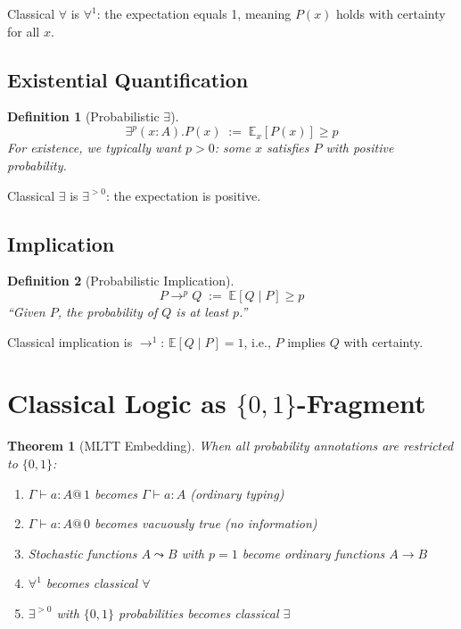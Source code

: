 \documentclass[11pt,a4paper]{article}
\makeatletter
\newtheorem{definition}{Definition}[section]
\newtheorem{theorem}{Theorem}[section]
\newcommand{\E}{\mathbb{E}}
\newcommand{\pmark}[1]{@\, #1}  %
\makeatother
\begin{document}
Classical $\forall$ is $\forall^1$: the expectation equals 1, meaning $P(x)$ holds with certainty for all $x$.

\subsection{Existential Quantification}

\begin{definition}[Probabilistic $\exists$]
\[
\exists^p (x : A). P(x) \;:=\; \E_x[P(x)] \geq p
\]
For existence, we typically want $p > 0$: some $x$ satisfies $P$ with positive probability.
\end{definition}

Classical $\exists$ is $\exists^{>0}$: the expectation is positive.

\subsection{Implication}

\begin{definition}[Probabilistic Implication]
\[
P \to^p Q \;:=\; \E[Q \mid P] \geq p
\]
``Given $P$, the probability of $Q$ is at least $p$.''
\end{definition}

Classical implication is $\to^1$: $\E[Q \mid P] = 1$, i.e., $P$ implies $Q$ with certainty.

\section{Classical Logic as $\{0,1\}$-Fragment}

\begin{theorem}[MLTT Embedding]
When all probability annotations are restricted to $\{0, 1\}$:
\begin{enumerate}
    \item $\Gamma \vdash a : A \pmark{1}$ becomes $\Gamma \vdash a : A$ (ordinary typing)
    \item $\Gamma \vdash a : A \pmark{0}$ becomes vacuously true (no information)
    \item Stochastic functions $A \leadsto B$ with $p = 1$ become ordinary functions $A \to B$
    \item $\forall^1$ becomes classical $\forall$
    \item $\exists^{>0}$ with $\{0,1\}$ probabilities becomes classical $\exists$
\end{enumerate}
\end{theorem}
\end{document}
